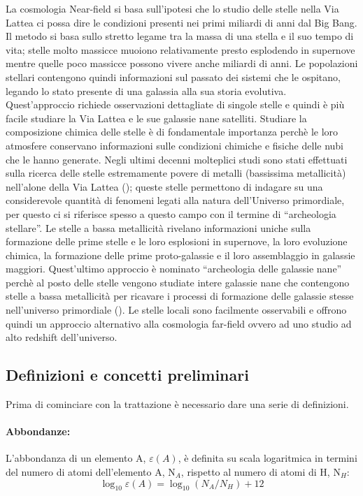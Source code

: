 \documentclass[12pt]{article}
\begin{document}
La cosmologia Near-field si basa sull’ipotesi che lo studio delle stelle nella Via Lattea ci possa dire le condizioni presenti nei primi miliardi di anni dal Big Bang. Il metodo si basa sullo stretto legame tra la massa di una stella e il suo tempo di vita; stelle molto massicce muoiono relativamente presto esplodendo in supernove mentre quelle poco massicce possono vivere anche miliardi di anni. Le popolazioni stellari contengono quindi informazioni sul passato dei sistemi che le ospitano, legando lo stato presente di una galassia alla sua storia evolutiva.
Quest’approccio richiede osservazioni dettagliate di singole stelle e quindi è più facile studiare la Via Lattea e le sue galassie nane satelliti.
Studiare la composizione chimica delle stelle è di fondamentale importanza perchè le loro atmosfere conservano informazioni sulle condizioni chimiche e fisiche delle nubi che le hanno generate. Negli ultimi decenni molteplici studi sono stati effettuati sulla ricerca delle stelle estremamente povere di metalli (bassissima metallicità) nell’alone della Via Lattea (\cite{Beers}); queste stelle permettono di indagare su una considerevole quantità di fenomeni legati alla natura dell’Universo primordiale, per questo ci si riferisce spesso a questo campo con il termine di “archeologia stellare”. Le stelle a bassa metallicità rivelano informazioni uniche sulla formazione delle prime stelle e le loro esplosioni in supernove, la loro evoluzione chimica, la formazione delle prime proto-galassie e il loro assemblaggio in galassie maggiori. Quest’ultimo approccio è nominato “archeologia delle galassie nane” perchè al posto delle stelle vengono studiate intere galassie nane che contengono stelle a bassa metallicità per ricavare i processi di formazione delle galassie stesse nell’universo primordiale (\cite{Frebel2012}).
Le stelle locali sono facilmente osservabili e offrono quindi un approccio alternativo alla cosmologia far-field ovvero ad uno studio ad alto redshift dell’universo.

\newpage
\subsection{Definizioni e concetti preliminari}
Prima di cominciare con la trattazione è necessario dare una serie di definizioni.
\paragraph{Abbondanze:}
L’abbondanza di un elemento A, $\varepsilon(A)$, è definita su scala logaritmica in termini del numero di atomi dell’elemento A, N$_A$, rispetto al numero di atomi di H, N$_H$:
\begin{equation}
  \log_{10} \varepsilon(A) = \log_{10} (N_A/N_H) + 12
\end{equation}
\end{document}
